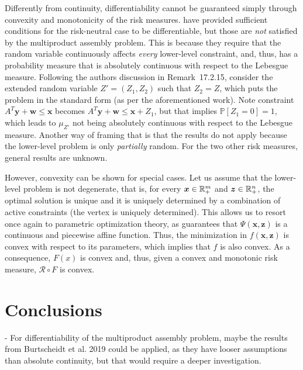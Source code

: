 \documentclass[12pt]{article}
\begin{document}
Differently from continuity, differentiability cannot be guaranteed simply through convexity and monotonicity of the risk measures.
\citet[Proposition~17.2.13]{burtscheidtRiskAverseModelsBilevel2020} have provided sufficient conditions for the risk-neutral case to be differentiable, but those are \emph{not} satisfied by the multiproduct assembly problem.
This is because they require that the random variable continuously affects \emph{every} lower-level constraint, and, thus, has a probability measure that is absolutely continuous with respect to the Lebesgue measure.
Following the authors discussion in Remark~17.2.15, consider the extended random variable $Z'=(Z_1,Z_2)$ such that $Z_2=Z$, which puts the problem in the standard form (as per the aforementioned work).
Note constraint $A^{T}\bm{y} + \bm{w} \le \bm{x}$ becomes $A^{T}\bm{y} + \bm{w} \le \bm{x} + Z_1$, but that implies $\mathbb{P}[Z_1=0]=1$, which leads to $\mu_{Z'}$ not being absolutely continuous with respect to the Lebesgue measure.
Another way of framing that is that the results do not apply because the lower-level problem is only \emph{partially} random.
For the two other risk measures, general results are unknown.

However, convexity can be shown for special cases.
Let us assume that the lower-level problem is not degenerate, that is, for every $\bm{x} \in \mathbb{R}^{m}_{+}$ and $\bm{z}\in \mathbb{R}^{n}_{+}$, the optimal solution is unique and it is uniquely determined by a combination of active constraints (the vertex is uniquely determined).
This allows us to resort once again to parametric optimization theory, as \citep[Theorem~2.1]{pistikopoulosMultiparametricOptimizationControl2021} guarantees that $\Psi(\bm{x},\bm{z})$ is a continuous and piecewise affine function.
Thus, the minimization in $f(\bm{x},\bm{z})$ is convex with respect to its parameters, which implies that $f$ is also convex.
As a consequence, $F(x)$ is convex and, thus, given a convex and monotonic risk measure, $\mathcal{R} \circ F$ is convex.




\section*{Conclusions}


- For differentiability of the multiproduct assembly problem, maybe the results from Burtscheidt et al. 2019 could be applied, as they have looser assumptions than absolute continuity, but that would require a deeper investigation.



% 
\printbibliography
    
\end{document}
